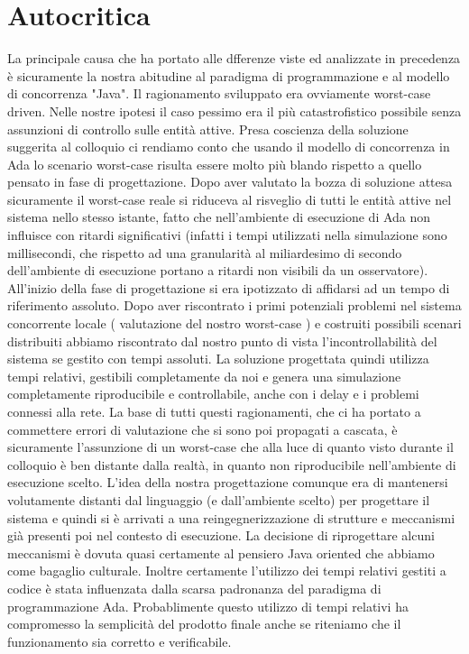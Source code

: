 \section{Autocritica}
La principale causa che ha portato alle dfferenze viste ed analizzate in precedenza è sicuramente la nostra abitudine al paradigma di programmazione e al modello di concorrenza "Java". Il ragionamento sviluppato era ovviamente worst-case driven.  Nelle nostre ipotesi il caso pessimo era il più catastrofistico possibile senza assunzioni di controllo sulle entità attive. Presa coscienza della soluzione suggerita al colloquio ci rendiamo conto che usando il modello di concorrenza in Ada lo scenario worst-case risulta essere molto più blando rispetto a quello pensato in fase di progettazione. Dopo aver valutato la bozza di soluzione attesa sicuramente il worst-case reale si riduceva al risveglio di tutti le entità attive nel sistema nello stesso istante, fatto che nell'ambiente di esecuzione di Ada non influisce con ritardi significativi (infatti i tempi utilizzati nella simulazione sono millisecondi, che rispetto ad una granularità al miliardesimo di secondo dell’ambiente di esecuzione portano a ritardi non visibili da un osservatore). All'inizio della fase di progettazione si era ipotizzato di affidarsi ad un tempo di riferimento assoluto. Dopo aver riscontrato i primi potenziali problemi nel sistema concorrente locale ( valutazione del nostro worst-case ) e costruiti possibili scenari distribuiti abbiamo riscontrato dal nostro punto di vista l'incontrollabilità del sistema se gestito con tempi assoluti. La soluzione progettata quindi utilizza tempi relativi, gestibili completamente da noi e genera  una simulazione completamente riproducibile e controllabile, anche con i delay e i problemi connessi alla rete. La base di tutti questi ragionamenti, che ci ha portato a commettere errori di valutazione che si sono poi propagati a cascata, è sicuramente l'assunzione di un worst-case che alla luce di quanto visto durante il colloquio è ben distante dalla realtà, in quanto non riproducibile nell'ambiente di esecuzione scelto. L'idea della nostra progettazione comunque era di mantenersi volutamente distanti dal linguaggio (e dall'ambiente scelto) per progettare il sistema e quindi si è arrivati a una reingegnerizzazione di strutture e meccanismi già presenti poi nel contesto di esecuzione. La decisione di riprogettare alcuni meccanismi è dovuta quasi certamente al pensiero Java oriented che abbiamo come bagaglio culturale. Inoltre certamente l’utilizzo dei tempi relativi gestiti a codice è stata influenzata dalla scarsa padronanza del paradigma di programmazione Ada. Probablimente questo utilizzo di tempi relativi ha compromesso la semplicità del prodotto finale anche se riteniamo che il funzionamento sia corretto e verificabile.\\
